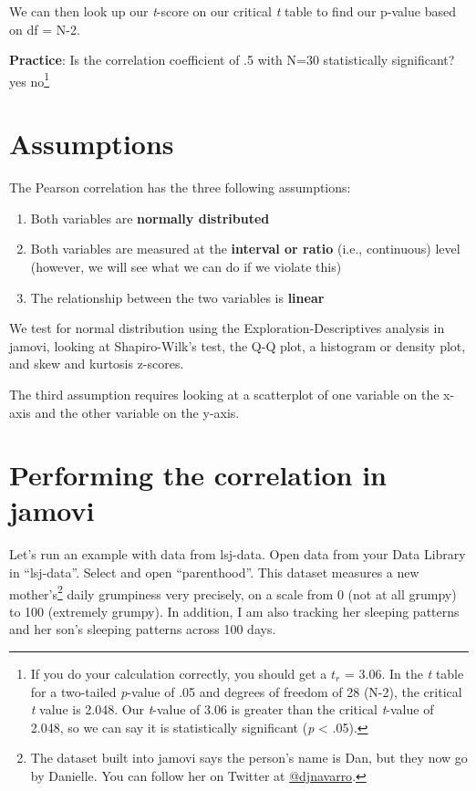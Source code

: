 \documentclass[
]{book}
\begin{document}
We can then look up our \emph{t}-score on our critical \emph{t} table to find our p-value based on df = N-2.

\textbf{Practice}: Is the correlation coefficient of .5 with N=30 statistically significant? yes no\footnote{If you do your calculation correctly, you should get a \(t_r\) = 3.06. In the \emph{t} table for a two-tailed \emph{p}-value of .05 and degrees of freedom of 28 (N-2), the critical \emph{t} value is 2.048. Our \emph{t}-value of 3.06 is greater than the critical \emph{t}-value of 2.048, so we can say it is statistically significant (\emph{p} \textless{} .05).}

\hypertarget{assumptions-3}{%
\section{Assumptions}\label{assumptions-3}}

The Pearson correlation has the three following assumptions:

\begin{enumerate}
\def\labelenumi{\arabic{enumi}.}
\item
  Both variables are \textbf{normally distributed}
\item
  Both variables are measured at the \textbf{interval or ratio} (i.e., continuous) level (however, we will see what we can do if we violate this)
\item
  The relationship between the two variables is \textbf{linear}
\end{enumerate}

We test for normal distribution using the Exploration-Descriptives analysis in jamovi, looking at Shapiro-Wilk's test, the Q-Q plot, a histogram or density plot, and skew and kurtosis z-scores.

The third assumption requires looking at a scatterplot of one variable on the x-axis and the other variable on the y-axis.

\hypertarget{performing-the-correlation-in-jamovi}{%
\section{Performing the correlation in jamovi}\label{performing-the-correlation-in-jamovi}}

Let's run an example with data from lsj-data. Open data from your Data Library in ``lsj-data''. Select and open ``parenthood''. This dataset measures a new mother's\footnote{The dataset built into jamovi says the person's name is Dan, but they now go by Danielle. You can follow her on Twitter at \href{https://twitter.com/djnavarro}{@djnavarro}.} daily grumpiness very precisely, on a scale from 0 (not at all grumpy) to 100 (extremely grumpy). In addition, I am also tracking her sleeping patterns and her son's sleeping patterns across 100 days.
\end{document}
